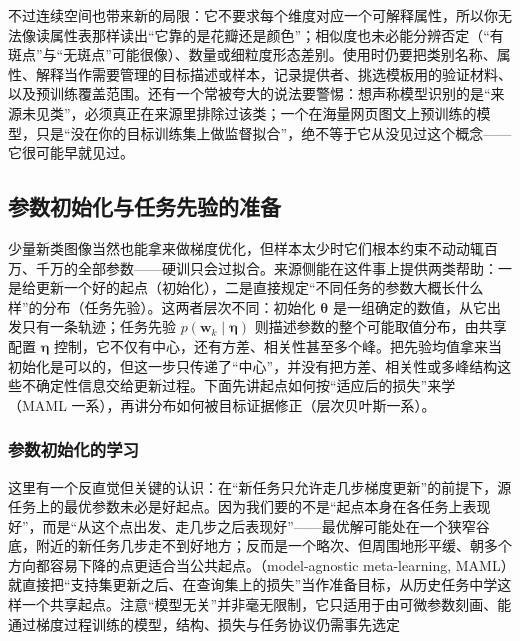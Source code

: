 不过连续空间也带来新的局限：它不要求每个维度对应一个可解释属性，所以你无法像读属性表那样读出“它靠的是花瓣还是颜色”；相似度也未必能分辨否定（“有斑点”与“无斑点”可能很像）、数量或细粒度形态差别。使用时仍要把类别名称、属性、解释当作需要管理的目标描述或样本，记录提供者、挑选模板用的验证材料、以及预训练覆盖范围。还有一个常被夸大的说法要警惕：想声称模型识别的是“来源未见类”，必须真正在来源里排除过该类；一个在海量网页图文上预训练的模型，只是“没在你的目标训练集上做监督拟合”，绝不等于它从没见过这个概念——它很可能早就见过。

\subsection{参数初始化与任务先验的准备}
\label{sec:ket-transfer-initialization-prior}

少量新类图像当然也能拿来做梯度优化，但样本太少时它们根本约束不动动辄百万、千万的全部参数——硬训只会过拟合。来源侧能在这件事上提供两类帮助：一是给更新一个好的起点（初始化），二是直接规定“不同任务的参数大概长什么样”的分布（任务先验）。这两者层次不同：初始化 $\bm\theta$ 是一组确定的数值，从它出发只有一条轨迹；任务先验 $p(\bm w_k\mid\bm\eta)$ 则描述参数的整个可能取值分布，由共享配置 $\bm\eta$ 控制，它不仅有中心，还有方差、相关性甚至多个峰。把先验均值拿来当初始化是可以的，但这一步只传递了“中心”，并没有把方差、相关性或多峰结构这些不确定性信息交给更新过程。下面先讲起点如何按“适应后的损失”来学（MAML 一系），再讲分布如何被目标证据修正（层次贝叶斯一系）。

\subsubsection{参数初始化的学习}
\label{sec:ket-transfer-maml}

这里有一个反直觉但关键的认识：在“新任务只允许走几步梯度更新”的前提下，源任务上的最优参数未必是好起点。因为我们要的不是“起点本身在各任务上表现好”，而是“从这个点出发、走几步之后表现好”——最优解可能处在一个狭窄谷底，附近的新任务几步走不到好地方；反而是一个略次、但周围地形平缓、朝多个方向都容易下降的点更适合当公共起点。（model-agnostic meta-learning, MAML）就直接把“支持集更新之后、在查询集上的损失”当作准备目标，从历史任务中学这样一个共享起点。注意“模型无关”并非毫无限制，它只适用于由可微参数刻画、能通过梯度过程训练的模型，结构、损失与任务协议仍需事先选定

